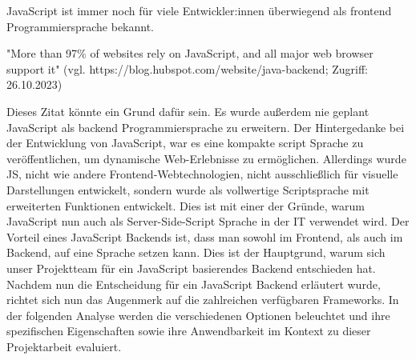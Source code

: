 JavaScript ist immer noch für viele Entwickler:innen überwiegend als frontend Programmiersprache bekannt. 

"More than 97\% of websites rely on JavaScript, and all major web browser support it"
(vgl. https://blog.hubspot.com/website/java-backend; Zugriff: 26.10.2023)

Dieses Zitat könnte ein Grund dafür sein. Es wurde außerdem nie geplant JavaScript als backend Programmiersprache zu erweitern. Der Hintergedanke bei der Entwicklung von JavaScript, war es eine kompakte script Sprache zu veröffentlichen, um dynamische Web-Erlebnisse zu ermöglichen. Allerdings wurde JS, nicht wie andere Frontend-Webtechnologien, nicht ausschließlich für visuelle Darstellungen entwickelt, sondern wurde als vollwertige Scriptsprache mit erweiterten Funktionen entwickelt. Dies ist mit einer der Gründe, warum JavaScript nun auch als Server-Side-Script Sprache in der IT verwendet wird.
\newline
Der Vorteil eines JavaScript Backends ist, dass man sowohl im Frontend, als auch im Backend, auf eine Sprache setzen kann. Dies ist der Hauptgrund, warum sich unser Projektteam für ein JavaScript basierendes Backend entschieden hat.
\newline
Nachdem nun die Entscheidung für ein JavaScript Backend erläutert wurde, richtet sich nun das Augenmerk auf die zahlreichen verfügbaren Frameworks. In der folgenden Analyse werden die verschiedenen Optionen beleuchtet und ihre spezifischen Eigenschaften sowie ihre Anwendbarkeit im Kontext zu dieser Projektarbeit evaluiert.
\cite{Backend_JavaScript}